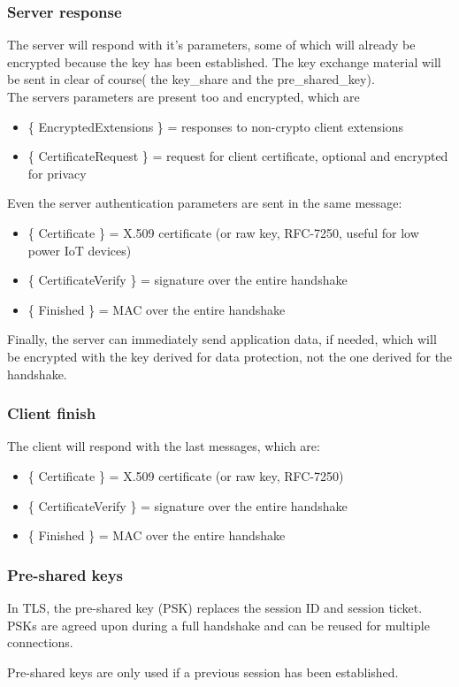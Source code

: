 \subsubsection{Server response}
The server will respond with it's parameters, some of which will
already be encrypted because the key has been established. The key
exchange material will be sent in clear of course( the key\_share 
and the pre\_shared\_key).\\
The servers parameters are present too and encrypted, which are 
\begin{itemize}
\item \{ EncryptedExtensions \} = responses to non-crypto client
  extensions
\item \{ CertificateRequest \} = request for client certificate,
  optional and encrypted for privacy
\end{itemize}
Even the server authentication parameters are sent in the same
message:
\begin{itemize}
\item \{ Certificate \} = X.509 certificate (or raw key, RFC-7250,
  useful for low power IoT devices)
\item \{ CertificateVerify \} = signature over the entire handshake
\item \{ Finished \} = MAC over the entire handshake
\end{itemize}
Finally, the server can immediately send application data, if needed,
which will be encrypted with the key derived for data protection, not
the one derived for the handshake.
\subsubsection{Client finish}
The client will respond with the last messages, which are:
\begin{itemize}
  \item \{ Certificate \} = X.509 certificate (or raw key, RFC-7250)
  \item \{ CertificateVerify \} = signature over the entire handshake
  \item \{ Finished \} = MAC over the entire handshake
\end{itemize}
\subsubsection{Pre-shared keys}
In TLS, the pre-shared key (PSK) replaces the session ID and session
ticket. PSKs are agreed upon during a full handshake and can be reused
for multiple connections.
\begin{boxH}
  Pre-shared keys are only used if a previous session has been 
  established.
\end{boxH}

